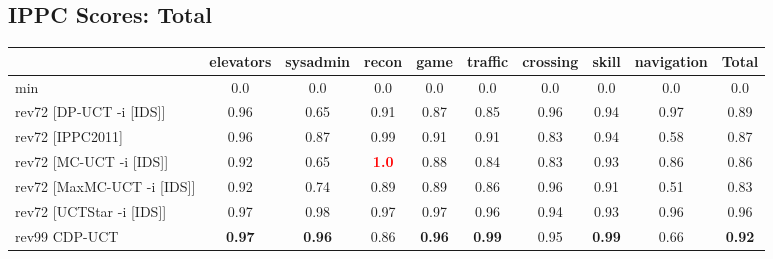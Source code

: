 \documentclass{article}
\begin{document}
\bigskip

\subsection*{IPPC Scores: Total}

\begin{tabular}{|l|r@{$\pm$}rr@{$\pm$}rr@{$\pm$}rr@{$\pm$}rr@{$\pm$}rr@{$\pm$}rr@{$\pm$}rr@{$\pm$}rr@{$\pm$}r|}
\hline

& \multicolumn{2}{c}{elevators}
& \multicolumn{2}{c}{sysadmin}
& \multicolumn{2}{c}{recon}
& \multicolumn{2}{c}{game}
& \multicolumn{2}{c}{traffic}
& \multicolumn{2}{c}{crossing}
& \multicolumn{2}{c}{skill}
& \multicolumn{2}{c}{navigation}
& \multicolumn{2}{c|}{Total}
\\
\hline
\hline
min
& \multicolumn{2}{c}{0.0}
& \multicolumn{2}{c}{0.0}
& \multicolumn{2}{c}{0.0}
& \multicolumn{2}{c}{0.0}
& \multicolumn{2}{c}{0.0}
& \multicolumn{2}{c}{0.0}
& \multicolumn{2}{c}{0.0}
& \multicolumn{2}{c}{0.0}
& \multicolumn{2}{c|}{0.0}
\\
rev72 [DP-UCT -i [IDS]]
& \multicolumn{2}{c}{0.96}
& \multicolumn{2}{c}{0.65}
& \multicolumn{2}{c}{0.91}
& \multicolumn{2}{c}{0.87}
& \multicolumn{2}{c}{0.85}
& \multicolumn{2}{c}{0.96}
& \multicolumn{2}{c}{0.94}
& \multicolumn{2}{c}{0.97}
& \multicolumn{2}{c|}{0.89}
\\
rev72 [IPPC2011]
& \multicolumn{2}{c}{0.96}
& \multicolumn{2}{c}{0.87}
& \multicolumn{2}{c}{0.99}
& \multicolumn{2}{c}{0.91}
& \multicolumn{2}{c}{0.91}
& \multicolumn{2}{c}{0.83}
& \multicolumn{2}{c}{0.94}
& \multicolumn{2}{c}{0.58}
& \multicolumn{2}{c|}{0.87}
\\
rev72 [MC-UCT -i [IDS]]
& \multicolumn{2}{c}{0.92}
& \multicolumn{2}{c}{0.65}
& \multicolumn{2}{c}{\textbf{\textcolor{red}{1.0}}}
& \multicolumn{2}{c}{0.88}
& \multicolumn{2}{c}{0.84}
& \multicolumn{2}{c}{0.83}
& \multicolumn{2}{c}{0.93}
& \multicolumn{2}{c}{0.86}
& \multicolumn{2}{c|}{0.86}
\\
rev72 [MaxMC-UCT -i [IDS]]
& \multicolumn{2}{c}{0.92}
& \multicolumn{2}{c}{0.74}
& \multicolumn{2}{c}{0.89}
& \multicolumn{2}{c}{0.89}
& \multicolumn{2}{c}{0.86}
& \multicolumn{2}{c}{0.96}
& \multicolumn{2}{c}{0.91}
& \multicolumn{2}{c}{0.51}
& \multicolumn{2}{c|}{0.83}
\\
rev72 [UCTStar -i [IDS]]
& \multicolumn{2}{c}{0.97}
& \multicolumn{2}{c}{0.98}
& \multicolumn{2}{c}{0.97}
& \multicolumn{2}{c}{0.97}
& \multicolumn{2}{c}{0.96}
& \multicolumn{2}{c}{0.94}
& \multicolumn{2}{c}{0.93}
& \multicolumn{2}{c}{0.96}
& \multicolumn{2}{c|}{0.96}
\\
\hline
rev99 CDP-UCT
& \multicolumn{2}{c}{\textbf{0.97}}
& \multicolumn{2}{c}{\textbf{0.96}}
& \multicolumn{2}{c}{0.86}
& \multicolumn{2}{c}{\textbf{0.96}}
& \multicolumn{2}{c}{\textbf{0.99}}
& \multicolumn{2}{c}{0.95}
& \multicolumn{2}{c}{\textbf{0.99}}
& \multicolumn{2}{c}{0.66}
& \multicolumn{2}{c|}{\textbf{0.92}}
\\
\hline
\end{tabular}%

\bigskip
\end{document}
